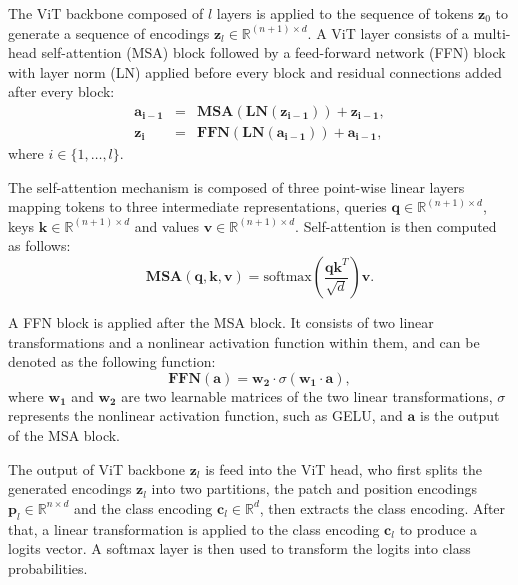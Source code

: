 \documentclass[anon,12pt]{colt2024} %
\begin{document}
The ViT backbone composed of $l$ layers is applied to the sequence of tokens $\mathbf{z}_0$ to generate a sequence of encodings $\mathbf{z}_l \in \mathbb{R} ^ {(n+1) \times d}$.
A ViT layer consists of a multi-head self-attention (MSA) block followed by a feed-forward network (FFN) block with layer norm (LN) applied before every block and residual connections added after every block:
\begin{eqnarray}
  \mathbf{a_{i-1}} &=& \mathbf{MSA}(\mathbf{LN}(\mathbf{z_{i-1}})) + \mathbf{z_{i-1}} , \\
  \mathbf{z_{i}} &=& \mathbf{FFN}(\mathbf{LN}(\mathbf{a_{i-1}})) + \mathbf{a_{i-1}},
\end{eqnarray}
where $i \in \{1,\ldots,l\}$.

The self-attention mechanism is composed of three point-wise linear layers mapping tokens to three intermediate representations, queries $\mathbf{q} \in \mathbb{R}^{(n+1) \times d}$, keys $\mathbf{k} \in \mathbb{R}^{(n+1) \times d}$ and values $\mathbf{v} \in \mathbb{R}^{(n+1) \times d}$.
Self-attention is then computed as follows:
\begin{equation}
   \mathbf{MSA}(\mathbf{q}, \mathbf{k}, \mathbf{v}) = \mathrm{softmax} \left( \frac{\mathbf{q}\mathbf{k}^T}{\sqrt{d}} \right)  \mathbf{v}.
\end{equation}

A FFN block is applied after the MSA block. It consists of two linear transformations and a nonlinear activation function within them, and can be denoted as the following function:
\begin{equation}
  \mathbf{FFN}(\mathbf{a}) = \mathbf{w_2} \cdot \sigma(\mathbf{w_1} \cdot \mathbf{a}),
\end{equation}
where $\mathbf{w_1}$ and $\mathbf{w_2}$ are two learnable matrices of the two linear transformations, $\sigma$ represents the nonlinear activation function, such as GELU, and  $\mathbf{a}$ is the output of the MSA block.

The output of ViT backbone $\mathbf{z}_l$ is feed into the ViT head, who first splits the generated encodings $\mathbf{z}_l$ into two partitions, the patch and position encodings $\mathbf{p}_l \in \mathbb{R} ^ {n \times d}$ and the class encoding $\mathbf{c}_l \in \mathbb{R}^d$, then extracts the class encoding.
After that, a linear transformation is applied to the class encoding $\mathbf{c}_l$ to produce a logits vector. A softmax layer is then used to transform the logits into class probabilities.
\end{document}
